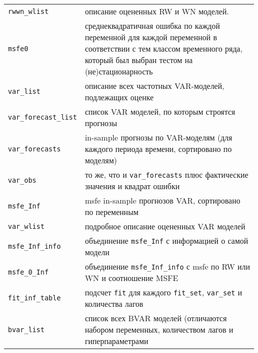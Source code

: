 \documentclass[11pt]{article} %
\begin{document}
\begin{center}
\begin{table}[h!]
\begin{tabular}{lp{10cm}}
 \verb|rwwn_wlist| & описание оцененных RW и WN моделей. \\
 \verb|msfe0| & среднеквадратичная ошибка по каждой переменной для каждой переменной в соответствии с тем классом временного ряда, который был выбран тестом на (не)стационарность\\
\midrule
 \verb|var_list| & описание всех частотных VAR-моделей, подлежащих оценке\\
 \verb|var_forecast_list| & список VAR моделей, по которым строятся прогнозы\\
 \verb|var_forecasts| & in-sample прогнозы по VAR-моделям (для каждого периода времени, сортировано по моделям)\\
 \verb|var_obs| & то же, что и \verb|var_forecasts| плюс фактические значения и квадрат ошибки\\
 \verb|msfe_Inf| & msfe in-sample прогнозов VAR, сортировано по переменным\\
\midrule
 \verb|var_wlist| & подробное описание оцененных VAR моделей\\
 \verb|msfe_Inf_info| & объединение \verb|msfe_Inf| с информацией о самой модели \\
 \verb|msfe_0_Inf| & объединение \verb|msfe_Inf_info| с msfe по RW или WN и соотношение MSFE\\
 \verb|fit_inf_table| & подсчет \verb|fit| для каждого \verb|fit_set|, \verb|var_set| и количества лагов \\
 \verb|bvar_list| & список всех BVAR моделей (отличаются набором переменных, количеством лагов и гиперпараметрами\\
\bottomrule
\end{tabular}
\end{table}
\end{center}

\newpage
\end{document}

